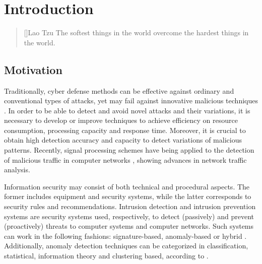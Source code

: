 \chapter{Introduction}
\label{ch:1_introduction}

\begin{quotation}[]{Lao Tzu}
The softest things in the world overcome the hardest things in the world.
\end{quotation}


\section{Motivation}
\label{sc:motivation}

Traditionally, cyber defense methods can be effective against ordinary and conventional types of attacks, yet may fail against innovative malicious techniques \cite{lakhina2005mining}. In order to be able to detect and avoid novel attacks and their variations, it is necessary to develop or improve techniques to achieve efficiency on resource consumption, processing capacity and response time. Moreover, it is crucial to obtain high detection accuracy and capacity to detect variations of malicious patterns. Recently, signal processing schemes have being applied to the detection of malicious traffic in computer networks \cite{Lu2009,Huang2009,Zonglin2009,david2011blind,da2012improved,tenorio2013greatest}, showing advances in network traffic analysis.

Information security may consist of both technical and procedural aspects. The former includes equipment and security systems, while the latter corresponds to security rules and recommendations. Intrusion detection and intrusion prevention systems are security systems used, respectively, to detect (passively) and prevent (proactively) threats to computer systems and computer networks. Such systems can work in the following fashions: signature-based, anomaly-based or hybrid \cite{Huang2009,mudzingwa2012study}. Additionally, anomaly detection techniques can be categorized in classification, statistical, information theory and clustering based, according to \cite{bhuyan2014network,ahmed2016survey,osanaiye2016distributed}.

